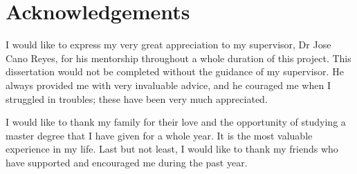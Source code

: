\section*{Acknowledgements}
    I would like to express my very great appreciation to my supervisor,
    Dr Jose Cano Reyes, for his mentorship throughout a whole duration of this project.
    This dissertation would not be completed without the guidance of my supervisor.
    He always provided me with very invaluable advice,
    and he couraged me when I struggled in troubles;
    these have been very much appreciated.

    I would like to thank my family for their love and the opportunity of studying a master degree that I have given for a whole year. It is the most valuable experience in my life.
    Last but not least, I would like to thank my friends who have supported and encouraged me during
    the past year.